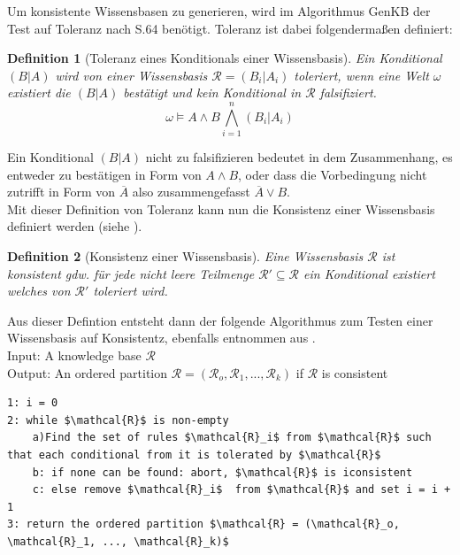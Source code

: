 \documentclass[12pt,a4paper]{article}
\newtheorem{theorem}{Definition}
\begin{document}
Um konsistente Wissensbasen zu generieren, wird im Algorithmus GenKB der Test auf Toleranz nach \cite{goldszmidt96}S.64 benötigt. Toleranz ist dabei folgendermaßen definiert:
\begin{theorem}[Toleranz eines Konditionals einer Wissensbasis]
\label{def:toleranz}
Ein Konditional $(B|A)$ wird von einer Wissensbasis $\mathcal{R} = {(B_i|A_i)}$ toleriert, wenn eine Welt $\omega$ existiert die $(B|A)$ bestätigt und kein Konditional in $\mathcal{R}$ falsifiziert.
\begin{equation}
\omega \models A \wedge B \bigwedge^n_{i=1}(B_i|A_i)
\end{equation}
\end{theorem}
Ein Konditional $(B|A)$ nicht zu falsifizieren bedeutet in dem Zusammenhang, es entweder zu bestätigen in Form von $A \wedge B$, oder dass die Vorbedingung nicht zutrifft in Form von $\overline{A}$ also zusammengefasst $\overline{A} \vee B$. \\
Mit dieser Definition von Toleranz kann nun die Konsistenz einer Wissensbasis definiert werden (siehe \cite{goldszmidt96}).
\begin{theorem}[Konsistenz einer Wissensbasis]
\label{def:konsistenz}
Eine Wissensbasis $\mathcal{R}$ ist konsistent gdw. für jede nicht leere Teilmenge $\mathcal{R}' \subseteq \mathcal{R}$ ein Konditional existiert welches von $\mathcal{R}'$ toleriert wird.
\end{theorem}
Aus dieser Defintion entsteht dann der folgende Algorithmus zum Testen einer Wissensbasis auf Konsistentz, ebenfalls entnommen aus \cite{goldszmidt96}. \\

Input: A knowledge base $\mathcal{R}$ \\
Output: An ordered partition $\mathcal{R} = (\mathcal{R}_o, \mathcal{R}_1, ...,  \mathcal{R}_k)$ if $\mathcal{R}$ is consistent \\
\begin{lstlisting}[mathescape=true]
1: i = 0
2: while $\mathcal{R}$ is non-empty
	a)Find the set of rules $\mathcal{R}_i$ from $\mathcal{R}$ such that each conditional from it is tolerated by $\mathcal{R}$
	b: if none can be found: abort, $\mathcal{R}$ is iconsistent
	c: else remove $\mathcal{R}_i$  from $\mathcal{R}$ and set i = i + 1
3: return the ordered partition $\mathcal{R} = (\mathcal{R}_o, \mathcal{R}_1, ..., \mathcal{R}_k)$
\end{lstlisting}
\end{document}
